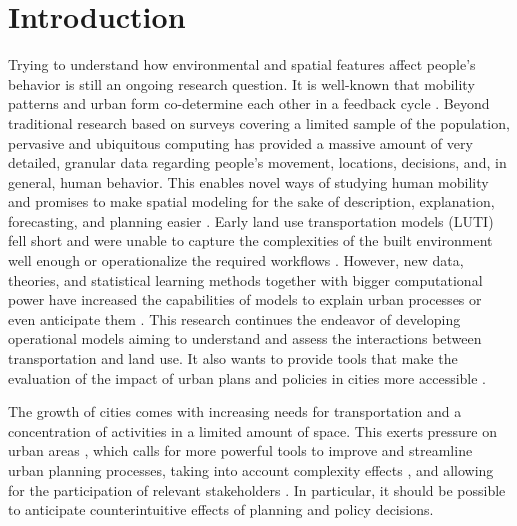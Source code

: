 \section{Introduction}
\label{sec:ETRCO2H_introduction}

Trying to understand how environmental and spatial features affect people's behavior is still an ongoing research question. It is well-known that mobility patterns and urban form co-determine each other \citep{Hansen1959HowUse} in a feedback cycle \citep{Wegener2021Land-UseModels, Crane2000, Ewing2010, Handy2002, Cervero1997}. Beyond traditional research based on surveys covering a limited sample of the population, pervasive and ubiquitous computing has provided a massive amount of very detailed, granular data regarding people's movement, locations, decisions, and, in general, human behavior. This enables novel ways of studying human mobility \citep{Lenormand2015InfluenceMobility} and promises to make spatial modeling for the sake of description, explanation, forecasting, and planning easier \citep{Wegener2001NewModels}. Early land use transportation models (LUTI) fell short and were unable to capture the complexities of the built environment well enough or operationalize the required workflows \citep{Lee1973RequiemModels}. However, new data, theories, and statistical learning methods together with bigger computational power have increased the capabilities of models to explain urban processes or even anticipate them \citep{Fotheringham1989SpatialApplications, Wegener2021Land-UseModels, Acheampong2015LandDirections}. This research continues the endeavor of developing operational models aiming to understand and assess the interactions between transportation and land use. It also wants to provide tools that make the evaluation of the impact of urban plans and policies in cities more accessible \citep{Cervero1997ParadigmPlanning}.

The growth of cities comes with increasing needs for transportation and a concentration of activities in a limited amount of space. This exerts pressure on urban areas \citep{Newman1998SustainabilityDependence, Echenique2012GrowingSustainably}, which calls for more powerful tools to improve and streamline urban planning processes, taking into account complexity effects %
, and allowing for the participation of relevant stakeholders \citep{Banister2008TheParadigm}. In particular, it should be possible to anticipate counterintuitive effects of planning and policy decisions. 

